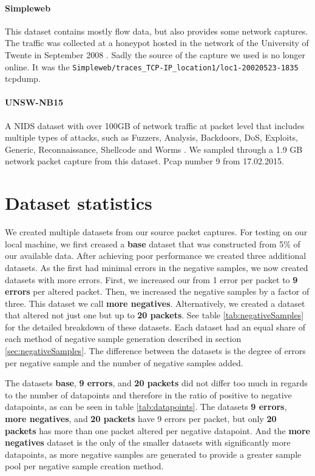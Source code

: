 \documentclass[
	ngerman,
	ruledheaders=section,%
	class=report,%
	thesis={type=bachelor},%
	accentcolor=9c,%
	custommargins=true,%
	marginpar=false,%
	parskip=half-,%
	fontsize=11pt,%
]{tudapub}
\let\code\texttt
\begin{document}
\paragraph{Simpleweb} This dataset contains mostly flow data, but also provides some network captures.
The traffic was collected at a honeypot hosted in the network of the University of Twente in September 2008 \cite{LabeledDatasetIntrusiona}.
Sadly the source of the capture we used is no longer online.
It was the \code{Simpleweb/traces\_TCP-IP\_location1/loc1-20020523-1835} tcpdump.

\paragraph{UNSW-NB15} A NIDS dataset with over 100GB of network traffic at packet level that includes multiple types of attacks, such as Fuzzers, Analysis, Backdoors, DoS, Exploits, Generic, Reconnaissance, Shellcode and Worms \cite{UNSWNB15DataSet}.
We sampled through a 1.9 GB network packet capture from this dataset.
Pcap number 9 from 17.02.2015.

\section{Dataset statistics}
\label{sec:datasetStats}

We created multiple datasets from our source packet captures.
For testing on our local machine, we first creased a \textbf{base} dataset that was constructed from 5\% of our available data.
After achieving poor performance we created three additional datasets.
As the first had minimal errors in the negative samples, we now created datasets with more errors.
First, we increased our from 1 error per packet to \textbf{9 errors} per altered packet.
Then, we increased the negative samples by a factor of three. This dataset we call \textbf{more negatives}.
Alternatively, we created a dataset that altered not just one but up to \textbf{20 packets}.
See table \ref{tab:negativeSamples} for the detailed breakdown of these datasets.
Each dataset had an equal share of each method of negative sample generation described in section \ref{sec:negativeSamples}.
The difference between the datasets is the degree of errors per negative sample and the number of negative samples added.

The datasets \textbf{base}, \textbf{9 errors}, and \textbf{20 packets} did not differ too much in regards to the number of datapoints and therefore in the ratio of positive to negative datapoints, as can be seen in table \ref{tab:datapoints}.
The datasets \textbf{9 errors}, \textbf{more negatives}, and \textbf{20 packets} have 9 errors per packet, but only \textbf{20 packets} has more than one packet altered per negative datapoint.
And the \textbf{more negatives} dataset is the only of the smaller datasets with significantly more datapoints, as more negative samples are generated to provide a greater sample pool per negative sample creation method.
\end{document}
